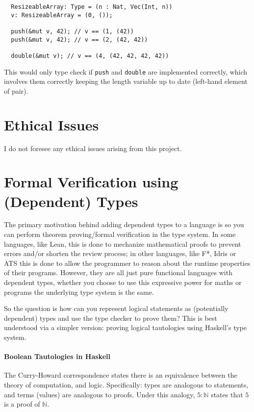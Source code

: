 \documentclass[12pt,twoside]{report}
\begin{document}
\begin{lstlisting}
  ResizeableArray: Type = (n : Nat, Vec(Int, n))
  v: ResizeableArray = (0, ());

  push(&mut v, 42); // v == (1, (42))
  push(&mut v, 42); // v == (2, (42, 42))

  double(&mut v); // v == (4, (42, 42, 42, 42))
\end{lstlisting}

This would only type check if \verb|push| and \verb|double| are implemented correctly, which involves them correctly keeping the length variable up to date (left-hand element of pair).

\chapter{Ethical Issues}
I do not foresee any ethical issues arising from this project.




\appendix 
{}

\chapter{Formal Verification using (Dependent) Types}
\label{verificationwithtypes}

The primary motivation behind adding dependent types to a language is so you can perform theorem proving/formal verification in the type system. In some languages, like Lean, this is done to mechanize mathematical proofs to prevent errors and/or shorten the review process; in other languages, like F*, Idris or ATS this is done to allow the programmer to reason about the runtime properties of their programs. However, they are all just pure functional languages with dependent types, whether you choose to use this expressive power for maths or programs the underlying type system is the same.

So the question is how can you represent logical statements as (potentially dependent) types and use the type checker to prove them? This is best understood via a simpler version: proving logical tautologies using Haskell's type system.

\subsubsection{Boolean Tautologies in Haskell}
The Curry-Howard correspondence states there is an equivalence between the theory of computation, and logic. Specifically: types are analogous to statements, and terms (values) are analogous to proofs. Under this analogy, $5 : \mathbb{N}$ states that $5$ is a proof of $\mathbb{N}$.
\end{document}
